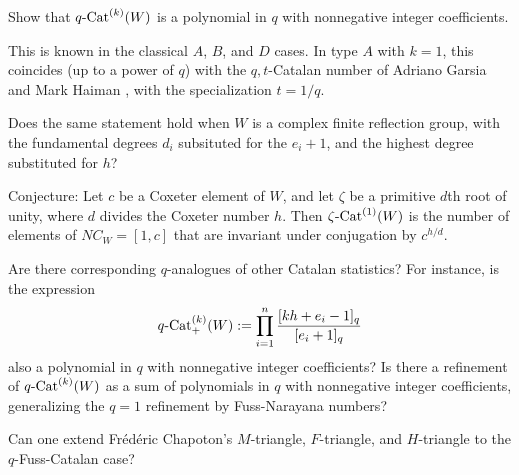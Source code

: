 \documentclass[12pt,letterpaper, reqno]{amsart}
\newcommand{\Cat}{{\rm Cat}}
\begin{document}
\begin{problemblock}
\begin{problem}\label{prob:qcat} Show that $q\text{-\Cat}^{(k)}(W)$ is a polynomial in $q$ with nonnegative integer coefficients.\end{problem}

This is known in the classical $A$, $B$, and $D$ cases. In type $A$ with $k=1$, this coincides (up to a power of $q$) with the $q,t$-Catalan number of Adriano Garsia and Mark Haiman \cite{garsia-haiman}, with the specialization $t=1/q$.

\begin{remark}
 Does the same statement hold when $W$ is a complex finite reflection group, with the fundamental degrees $d_i$ subsituted for the $e_i+1$, and the highest degree substituted for $h$?
\end{remark}

\begin{remark}
 Conjecture: Let $c$ be a Coxeter element of $W$, and let $\zeta$ be a primitive $d$th root of unity, where $d$ divides the Coxeter number $h$. Then $\zeta\text{-\Cat}^{(1)}(W)$ is the number of elements of $NC_W=[1,c]$ that are invariant under conjugation by $c^{h/d}$.
\end{remark}

\begin{remark}
 Are there corresponding $q$-analogues of other Catalan statistics? For instance, is the expression
\begin{equation*}
q\text{-\Cat}^{(k)}_+(W):=\prod_{i=1}^n \frac{[kh+e_i-1]_q}{[e_i+1]_q}
\end{equation*}
also a polynomial in $q$ with nonnegative integer coefficients? Is there a refinement of $q\text{-\Cat}^{(k)}(W)$ as a sum of polynomials in $q$ with nonnegative integer coefficients, generalizing the $q=1$ refinement by Fuss-Narayana numbers?
\end{remark}

\begin{remark}
Can one extend Fr\'ed\'eric Chapoton's $M$-triangle, $F$-triangle, and $H$-triangle to the $q$-Fuss-Catalan case?
\end{remark}

\end{problemblock}
\end{document}
